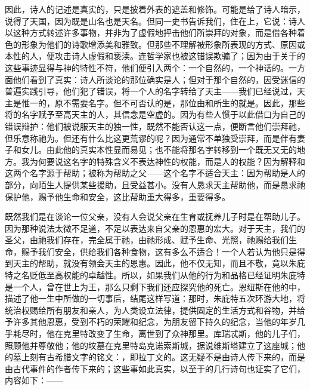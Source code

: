 因此，诗人的记述是真实的，只是披着外表的遮盖和修饰。可能是给了诗人暗示，说得了天国，因为既是山名也是天名。但同一史书告诉我们，住在上，它说：诗人以这种方式转述许多事物，并非为了虚假地抨击他们所崇拜的对象，而是借各种着色的形象为他们的诗歌增添美和雅致。但那些不理解被形象所表现的方式、原因或本性的人，便攻击诗人虚假和亵渎。连哲学家也被这错误欺骗了；因为由于关于的这些事迹显得与神的特性不符，他们便引入两个：一个自然的，一个神话的。一方面他们看到了真实：诗人所谈论的那位确实是人；但对于那个自然的，因受迷信的普遍实践引导，他们犯了错误，将一个人的名字转给了天主——我们已经说过，天主是惟一的，原不需要名字。但不可否认的是，那位由和所生的就是。因此，那些将的名字赋予至高天主的人，其信念是空虚的。因为有些人惯于以此借口为自己的错误辩护：他们被说服天主的独一性，既然不能否认这一点，便断言他们崇拜祂，但乐意称祂为。但还有什么比这更荒谬的呢？因为通常不单独受崇拜，而是伴有妻子和女儿。由此他的真实本性显而易见；也不能将那名字转移到一个既无又无的地方。我为何要说这名字的特殊含义不表达神性的权能，而是人的权能？因为解释和这两个名字源于帮助；被称为帮助之父——这个名字不适合天主：因为帮助是人的部分，向陌生人提供某些援助，且受益甚小。没有人恳求天主帮助他，而是恳求祂保护他，赐予他生命和安全，这比帮助重大得多，重要得多。\par

既然我们是在谈论一位父亲，没有人会说父亲在生育或抚养儿子时是在帮助儿子。因为那种说法太微不足道，不足以表达来自父亲的恩惠的宏大。对于天主，我们的圣父，由祂我们存在，完全属于祂，由祂形成、赋予生命、光照，祂赐给我们生命，赐予我们安全，供给我们各种食物，这有多么不适合！一个人若认为他只是得到天主的帮助，就没有领会天主的恩惠。因此，他不仅无知，而且不敬，竟以朱庇特之名贬低至高权能的卓越性。所以，如果我们从他的行为和品格已经证明朱庇特是一个人，曾在世上为王，那么只剩下我们还应探究他的死亡。恩纽斯在他的中，描述了他一生中所做的一切事后，结尾这样写道：那时，朱庇特五次环游大地，将统治权赐给所有朋友和亲人，为人类设立法律，提供固定的生活方式和谷物，并给予许多其他恩惠，受到不朽的荣耀和纪念，为朋友留下持久的纪念，当他的年岁几乎耗尽时，他在克里特改变了生命，离世到了众神那里。库瑞忒斯，他的儿子们，照顾他并尊敬他；他的坟墓在克里特岛克诺索斯城，据说维斯塔建立了这座城；他的墓上刻有古希腊文字的铭文：，即拉丁文的。这无疑不是由诗人传下来的，而是由古代事件的作者传下来的；这些事如此真实，以至于的几行诗句也证实了它们，内容如下：——\par

